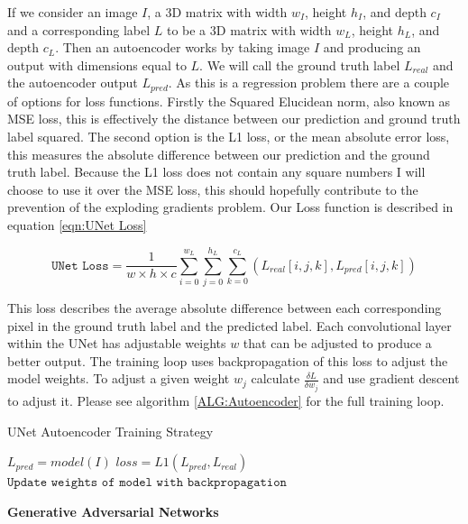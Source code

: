 \documentclass{UoYCSproject}
\begin{document}
If we consider an image $ I $, a 3D matrix with width $ w_I $, height $ h_I $, and depth $ c_I $ and a corresponding label $ L $ to be a 3D matrix with width $ w_L $, height $ h_L $, and depth $ c_L $. Then an autoencoder works by taking image $ I $ and producing an output with dimensions equal to $ L $. We will call the ground truth label $ L_{real} $ and the autoencoder output $ L_{pred} $. As this is a regression problem there are a couple of options for loss functions. Firstly the Squared Elucidean norm, also known as MSE loss, this is effectively the distance between our prediction and ground truth label squared. The second option is the L1 loss, or the mean absolute error loss, this measures the absolute difference between our prediction and the ground truth label.
Because the L1 loss does not contain any square numbers I will choose to use it over the MSE loss, this should hopefully contribute to the prevention of the exploding gradients problem. Our Loss function is described in equation \ref{eqn:UNet Loss}

\begin{equation}
    \label{eqn:UNet Loss}
    \texttt{UNet Loss} = \frac{1}{w \times h \times c} \sum_{i = 0}^{w_L} \sum_{j = 0}^{h_L} \sum_{k = 0}^{c_L}(L_{real}[i,j,k], L_{pred}[i,j,k] ) 
\end{equation}

This loss describes the average absolute difference between each corresponding pixel in the ground truth label and the predicted label. Each convolutional layer within the UNet has adjustable weights $w$ that can be adjusted to produce a better output. The training loop uses backpropagation of this loss to adjust the model weights. To adjust a given weight $w_j$ calculate $ \frac{\delta L}{\delta w_j} $ and use gradient descent to adjust it. Please see algorithm \ref{ALG:Autoencoder} for the full training loop.

\begin{algorithm}
\caption{UNet Autoencoder Training Strategy}\label{ALG:Autoencoder}
\begin{algorithmic}[1]
\State
\State $L_{pred} = model(I)$
\State $loss = L1( L_{pred}, L_{real} ) $
\State $\texttt{Update weights of model with backpropagation}$
\State
\EndFor
\EndFor
\end{algorithmic}
\end{algorithm}

\textbf{Generative Adversarial Networks}
\end{document}
